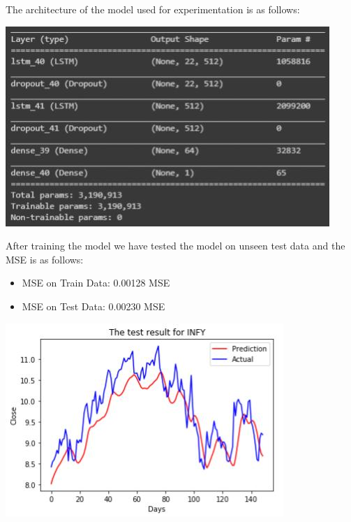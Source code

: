 The architecture of the model used for experimentation is as follows:

				\begin{center}
				\includegraphics[width=\linewidth]{figures/Model-Sumary.jpg}	
				\label{fig: The architecture of the LSTM model}
				\end{center}



After training the model we have tested the model on unseen test data and the MSE is as follows:
\begin{itemize}
\item MSE on Train Data: 0.00128 MSE
\item MSE on Test Data: 0.00230 MSE

\end{itemize}
				\begin{center}
				\includegraphics[width=\linewidth]{figures/test-data-results.jpg}	
				\label{fig: Plot showing of Actual and Predicted values}
				\end{center}

